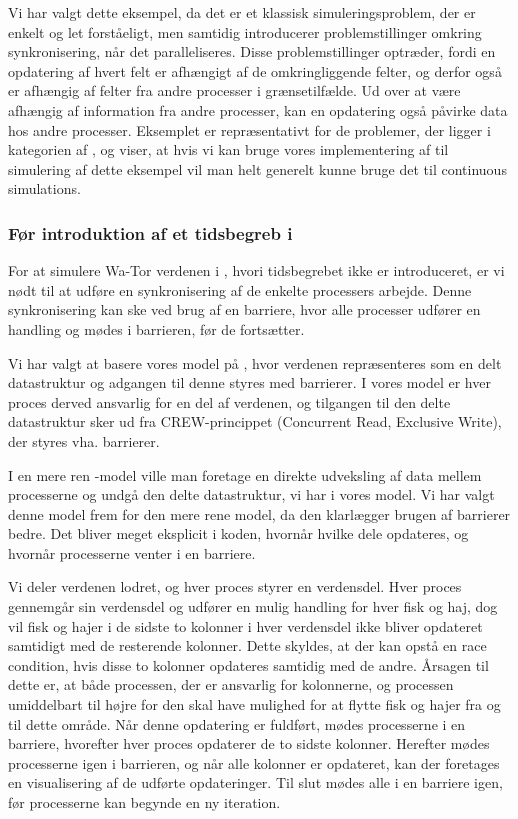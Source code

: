 Vi har valgt dette eksempel, da det er et klassisk simuleringsproblem, der er enkelt og let forståeligt, men samtidig 
introducerer problemstillinger omkring synkronisering, når det paralleliseres.  
Disse problemstillinger optræder, fordi en opdatering af hvert felt er afhængigt 
af de omkringliggende felter, og derfor også er afhængig af felter fra andre 
processer i grænsetilfælde. Ud over at være afhængig af information fra andre 
processer, kan en opdatering også påvirke data hos andre processer. Eksemplet er repræsentativt for de problemer, der ligger i kategorien af , og viser, at hvis vi kan bruge vores implementering af \des til simulering af dette eksempel vil man helt generelt kunne bruge det til continuous simulations.

\subsubsection{Før introduktion af et tidsbegreb i \pycsp}
For at simulere Wa-Tor verdenen i \pycsp, hvori tidsbegrebet ikke er introduceret, er vi nødt 
til at udføre en synkronisering af de enkelte processers arbejde. Denne 
synkronisering kan ske ved brug af en barriere, hvor alle processer udfører en 
handling og mødes i barrieren, før de fortsætter.

Vi har valgt at basere vores model på \cite{crew}, hvor verdenen repræsenteres 
som en delt datastruktur og adgangen til denne styres med barrierer. I vores 
model er hver proces derved ansvarlig for en del af verdenen, og tilgangen til 
den delte datastruktur sker ud fra CREW-princippet (Concurrent Read, Exclusive 
Write)\cite[5]{crew}, der styres vha. barrierer.  

I en mere ren \csp-model ville man foretage en direkte udveksling af data mellem 
processerne og undgå den delte datastruktur, vi har i vores model.  Vi har 
valgt denne model frem for den mere rene \csp model, da den klarlægger brugen af 
barrierer bedre.  Det bliver meget eksplicit i koden, hvornår hvilke dele 
opdateres, og hvornår processerne venter i en barriere.

Vi deler verdenen lodret, og hver proces styrer en verdensdel. Hver proces 
gennemgår sin verdensdel og udfører en mulig handling for hver fisk og haj, dog 
vil fisk og hajer i de sidste to kolonner i hver verdensdel ikke bliver 
opdateret samtidigt med de resterende kolonner. Dette skyldes, at der kan opstå en race 
condition, hvis disse to kolonner opdateres samtidig med de andre. Årsagen til 
dette er, at både processen, der er ansvarlig for kolonnerne, og processen 
umiddelbart til højre for den skal have mulighed for at flytte fisk og hajer fra og til dette område. 
Når denne 
opdatering er fuldført, mødes processerne i en barriere, hvorefter hver proces 
opdaterer de to sidste kolonner. Herefter mødes processerne igen i barrieren, 
og når alle kolonner er opdateret, kan der foretages en visualisering af de 
udførte opdateringer. Til slut mødes alle i en barriere igen, før processerne 
kan begynde en ny iteration.

